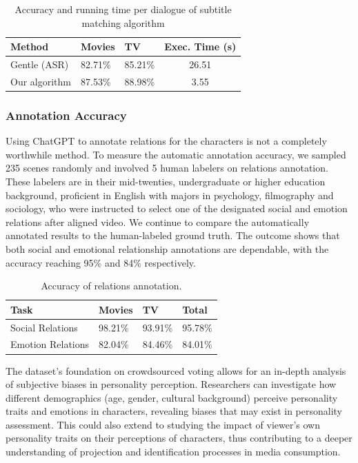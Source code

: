 \begin{table}[ht]
    \small
    \centering
    \begin{tabular}{lllc}
        \hline
        \textbf{Method} & \textbf{Movies} & \textbf{TV} & \textbf{Exec. Time (s)}\\
        \hline
        Gentle (ASR) & 82.71\% & 85.21\% & 26.51\\
        \hline
        Our algorithm & 87.53\% & 88.98\% & 3.55\\
        \hline
    \end{tabular}
    \caption{Accuracy and running time per dialogue of subtitle matching algorithm}
\label{table:alg_eval}
\end{table}

\subsubsection{Annotation Accuracy}
Using ChatGPT to annotate relations for the characters is not a completely worthwhile method. To measure the automatic annotation accuracy, we sampled 235 scenes randomly and involved 5 human labelers on relations annotation. These labelers are in their mid-twenties, 
undergraduate or higher education background, proficient in English with majors in psychology, filmography and sociology, who were instructed to select one of the designated social and emotion relations after aligned video. We continue to compare the automatically annotated results to the human-labeled ground truth. The outcome shows that both social and emotional relationship annotations are dependable, with the accuracy reaching 95\% and 84\% respectively.

\begin{table}[ht]
    \centering
    \small
    \begin{tabular}{llll}
        \hline
        \textbf{Task} & \textbf{Movies} & \textbf{TV} & \textbf{Total}\\
        \hline
        Social Relations& 98.21\% & 93.91\% & 95.78\%\\
        \hline
        Emotion Relations& 82.04\% & 84.46\% & 84.01\%\\
        \hline
    \end{tabular}
    \caption{Accuracy of relations annotation.} 
\label{table:annota_eval}
\end{table}

The dataset's foundation on crowdsourced voting allows for an in-depth analysis of subjective biases in personality perception. Researchers can investigate how different demographics (age, gender, cultural background) perceive personality traits and emotions in characters, revealing biases that may exist in personality assessment. This could also extend to studying the impact of viewer's own personality traits on their perceptions of characters, thus contributing to a deeper understanding of projection and identification processes in media consumption.

